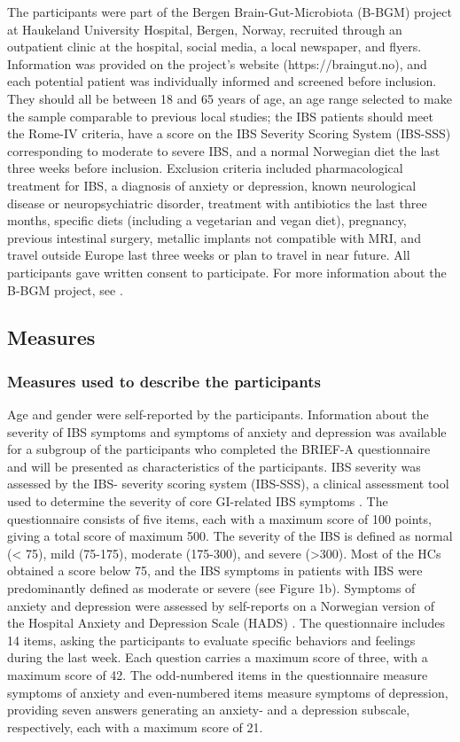 \documentclass[jcm,article,submit,pdftex,moreauthors]{Definitions/mdpi}
\begin{document}
The participants were part of the Bergen Brain-Gut-Microbiota (B-BGM) project at Haukeland University Hospital, Bergen, Norway, recruited through an outpatient clinic at the hospital, social media, a local newspaper, and flyers. Information was provided on the project’s website (https://braingut.no), and each potential patient was individually informed and screened before inclusion. They should all be between 18 and 65 years of age, an age range selected to make the sample comparable to previous local studies; the IBS patients should meet the Rome-IV criteria, have a score on the  IBS Severity Scoring System (IBS-SSS) corresponding to moderate to severe IBS, and a normal Norwegian diet the last three weeks before inclusion. Exclusion criteria included pharmacological treatment for IBS, a diagnosis of anxiety or depression, known neurological disease or neuropsychiatric disorder, treatment with antibiotics the last three months, specific diets (including a vegetarian and vegan diet), pregnancy, previous intestinal surgery, metallic implants not compatible with MRI, and travel outside Europe last three weeks or plan to travel in near future. All participants gave written consent to participate. For more information about the B-BGM project, see \cite{berentsen2020study}. 


\subsection{Measures}
\subsubsection{Measures used to describe the participants}
Age and gender were self-reported by the participants.  Information about the severity of IBS symptoms and symptoms of anxiety and depression was available for a subgroup of the participants who completed the BRIEF-A questionnaire and will be presented as characteristics of the participants. IBS severity was assessed by the IBS- severity scoring system (IBS-SSS), a clinical assessment tool used to determine the severity of core GI-related IBS symptoms \cite{francis1997irritable}. The questionnaire consists of five items, each with a maximum score of 100 points, giving a total score of maximum 500. The severity of the IBS is defined as normal (< 75), mild (75-175), moderate (175-300), and severe (>300). Most of the HCs obtained a score below 75, and the IBS symptoms in patients with IBS were predominantly defined as moderate or severe (see Figure 1b). 
Symptoms of anxiety and depression were assessed by self-reports on a Norwegian version of the Hospital Anxiety and Depression Scale (HADS) \cite{bjelland2002validity}.
The questionnaire includes 14 items, asking the participants to evaluate specific behaviors and feelings during the last week. Each question carries a maximum score of three, with a maximum score of 42. The odd-numbered items in the questionnaire measure symptoms of anxiety and even-numbered items measure symptoms of depression, providing seven answers generating an anxiety- and a depression subscale, respectively, each with a maximum score of 21. 
\end{document}
